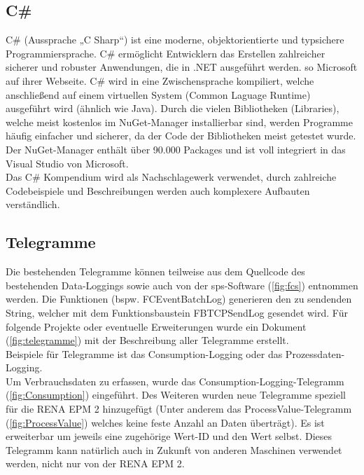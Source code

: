 \subsection{C\#}
\glqq  C\# (Aussprache „C Sharp“) ist eine moderne, objektorientierte und typsichere Programmiersprache. C\# ermöglicht Entwicklern das Erstellen zahlreicher sicherer und robuster Anwendungen, die in .NET ausgeführt werden.\grqq{} \cite{csharp} so Microsoft auf ihrer Webseite. C\# wird in eine Zwischensprache kompiliert, welche anschließend auf einem virtuellen System (Common Laguage Runtime) ausgeführt wird (ähnlich wie Java). Durch die vielen Bibliotheken (Libraries), welche meist kostenlos im NuGet-Manager installierbar sind, werden Programme häufig einfacher und sicherer, da der Code der Bibliotheken meist getestet wurde. Der NuGet-Manager enthält über 90.000 Packages und ist voll integriert in das Visual Studio von Microsoft. 
\ \\
Das C\# Kompendium \cite{CSharp-Buch} wird als Nachschlagewerk verwendet, durch zahlreiche Codebeispiele und Beschreibungen werden auch komplexere Aufbauten verständlich.
\subsection{Telegramme}
Die bestehenden Telegramme können teilweise aus dem Quellcode des bestehenden Data-Loggings sowie auch von der \ac{sps}-Software (\autoref{fig:fcs}) entnommen werden. Die Funktionen (bspw. \glqq FC\textunderscore Event\textunderscore Batch\textunderscore Log\grqq{}) generieren den zu sendenden String, welcher mit dem Funktionsbaustein \glqq FB\textunderscore TCP\textunderscore Send\textunderscore Log\grqq{} gesendet wird. Für folgende Projekte oder eventuelle Erweiterungen wurde ein Dokument (\autoref{fig:telegramme}) mit der Beschreibung aller Telegramme erstellt.
\ \\
Beispiele für Telegramme ist das \glqq Consumption\grqq{}-Logging oder das Prozessdaten-Logging.
\ \\
Um Verbrauchsdaten zu erfassen, wurde das \glqq Consumption\grqq{}-Logging-Telegramm (\autoref{fig:Consumption}) eingeführt. Des Weiteren wurden neue Telegramme speziell für die \glqq RENA EPM 2\grqq{} hinzugefügt (Unter anderem das ProcessValue-Telegramm (\autoref{fig:ProcessValue}) welches keine feste Anzahl an Daten überträgt). Es ist erweiterbar um jeweils eine zugehörige Wert-ID und den Wert selbst. Dieses Telegramm kann natürlich auch in Zukunft von anderen Maschinen verwendet werden, nicht nur von der \glqq RENA EPM 2\grqq{}.

